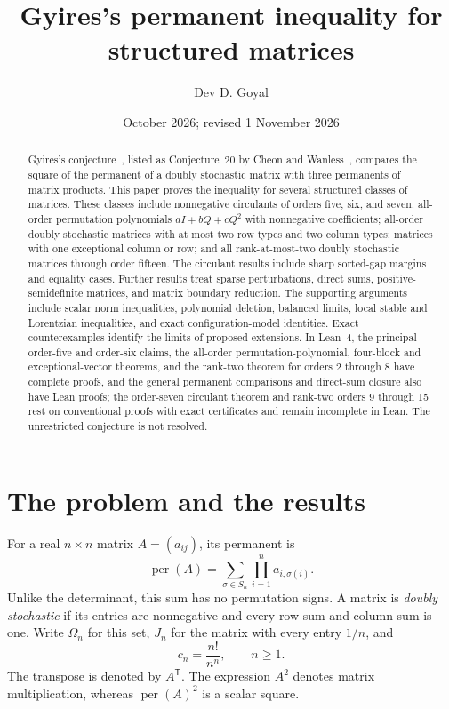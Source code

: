 \documentclass[11pt,a4paper]{article}
\title{Gyires's permanent inequality for structured matrices}
\author{Dev D. Goyal}
\date{October 2026; revised 1 November 2026}
\theoremstyle{definition}
\theoremstyle{remark}
\newcommand{\per}{\operatorname{per}}
\newcommand{\T}{\mathsf{T}}
\begin{document}
\maketitle
\begin{abstract}
Gyires's conjecture~\cite{gyires}, listed as Conjecture~20 by Cheon and Wanless~\cite{cw}, compares the square of the permanent of a doubly stochastic matrix with three permanents of matrix products.
This paper proves the inequality for several structured classes of matrices.
These classes include nonnegative circulants of orders five, six, and seven;
all-order permutation polynomials $aI+bQ+cQ^2$ with nonnegative coefficients;
all-order doubly stochastic matrices with at most two row types and two column types;
matrices with one exceptional column or row; and all rank-at-most-two doubly stochastic matrices through order fifteen.
The circulant results include sharp sorted-gap margins and equality cases.
Further results treat sparse perturbations, direct sums, positive-semidefinite matrices, and matrix boundary reduction.
The supporting arguments include scalar norm inequalities, polynomial deletion, balanced limits,
local stable and Lorentzian inequalities, and exact configuration-model identities.
Exact counterexamples identify the limits of proposed extensions.
In Lean~4, the principal order-five and order-six claims, the all-order permutation-polynomial, four-block and exceptional-vector theorems, and the rank-two theorem for orders 2 through 8 have complete proofs, and the general permanent comparisons and direct-sum closure also have Lean proofs; the order-seven circulant theorem and rank-two orders 9 through 15 rest on conventional proofs with exact certificates and remain incomplete in Lean.
The unrestricted conjecture is not resolved.
\end{abstract}

\tableofcontents

\section{The problem and the results}\label{sec:introduction}

For a real $n\times n$ matrix $A=(a_{ij})$, its permanent is
\[
\per(A)=\sum_{\sigma\in S_n}\prod_{i=1}^n a_{i,\sigma(i)}.
\]
Unlike the determinant, this sum has no permutation signs.
A matrix is \emph{doubly stochastic} if its entries are nonnegative and every row sum and column sum is one.
Write $\Omega_n$ for this set, $J_n$ for the matrix with every entry $1/n$, and
\[
c_n=\frac{n!}{n^n},\qquad n\ge1.
\]
The transpose is denoted by $A^\T$.
The expression $A^2$ denotes matrix multiplication, whereas $\per(A)^2$ is a scalar square.
\end{document}
